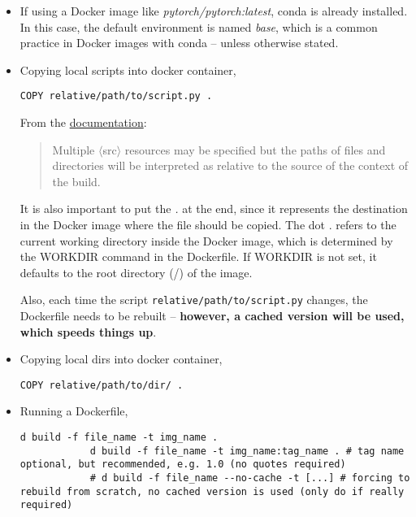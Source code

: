 \documentclass[12pt, a4paper]{scrbook}
\numberwithin{equation}{section}
\theoremstyle{definition}
\theoremstyle{definition}
\begin{document}
\begin{itemize}
		\item If using a Docker image like \textit{pytorch/pytorch:latest}, conda is already installed. In this case, the default environment is named \textit{base}, which is a common practice in Docker images with conda -- unless otherwise stated. 
		
		\item Copying local scripts into docker container, 
		
		\begin{lstlisting}[style=mystylebash, label=alg:docker_copy, xleftmargin=\parindent]
			COPY relative/path/to/script.py .
		\end{lstlisting}
		
		From the \href{https://docs.docker.com/engine/reference/builder/#copy}{documentation}:
		
		\begin{quote}
			Multiple $\langle$src$\rangle$ resources may be specified but the paths of files and directories will be interpreted as relative to the source of the context of the build. 
		\end{quote}
		
		It is also important to put the \textit{.} at the end, since it represents the destination in the Docker image where the file should be copied. The dot . refers to the current working directory inside the Docker image, which is determined by the WORKDIR command in the Dockerfile. If WORKDIR is not set, it defaults to the root directory (/) of the image.
		
		Also, each time the script \texttt{relative/path/to/script.py} changes, the Dockerfile needs to be rebuilt -- \textbf{however, a cached version will be used, which speeds things up}.
		
		\item Copying local dirs into docker container, 
		
		\begin{lstlisting}[style=mystylebash, label=alg:docker__copy_dir, xleftmargin=\parindent]
			COPY relative/path/to/dir/ .
		\end{lstlisting}
		
		\item Running a Dockerfile,
		
		\begin{lstlisting}[style=mystylebash, label=alg:docker_build, xleftmargin=\parindent]
			d build -f file_name -t img_name .
			d build -f file_name -t img_name:tag_name . # tag name optional, but recommended, e.g. 1.0 (no quotes required)
			# d build -f file_name --no-cache -t [...] # forcing to rebuild from scratch, no cached version is used (only do if really required)
		\end{lstlisting} 
		

\end{itemize}
\end{document}
